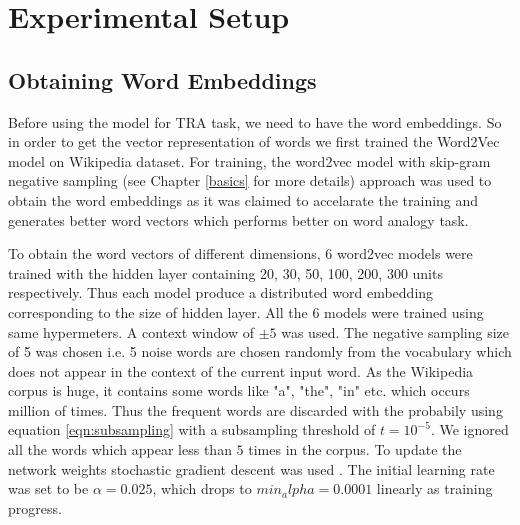 \section{Experimental Setup}

\subsection{Obtaining Word Embeddings} \label{get_word_embeddings}

Before using the model for TRA task, we need to have the word embeddings. So in order to get the vector representation of words we first trained the Word2Vec model on Wikipedia dataset. For training, the word2vec model with skip-gram negative sampling (see Chapter \ref{basics} for more details) approach was used to obtain the word embeddings as it was claimed to accelarate the training and generates better word vectors which performs better on word analogy task\cite{w2v:mikolov_2013_efficient, w2v:mikolov_2013_distributed}. 

To obtain the word vectors of different dimensions, 6 word2vec models were trained with the hidden layer containing 20, 30, 50, 100, 200, 300 units respectively. Thus each model produce a distributed word embedding corresponding to the size of hidden layer. All the 6 models were trained using same hypermeters. A context window of $\pm 5$ was used. The negative sampling size of 5 was chosen i.e. 5 noise words are chosen randomly from the vocabulary which does not appear in the context of the current input word. As the Wikipedia corpus is huge, it contains some words like "a", "the", "in" etc. which occurs million of times. Thus the frequent words are discarded with the probabily using equation \ref{eqn:subsampling} with a subsampling threshold of $t = 10^{-5}$. We ignored all the words which appear less than $5$ times in the corpus. To update the network weights stochastic gradient descent was used \cite{w2v:parameter_learning, w2v:mikolov_2013_distributed}. The initial learning rate was set to be $\alpha = 0.025$, which drops to $min_alpha = 0.0001$ linearly as training progress. 

